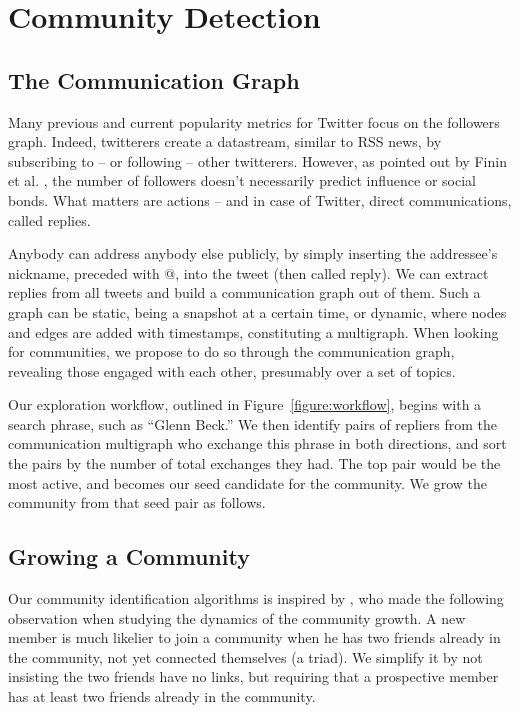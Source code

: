 \section{Community Detection}

\subsection{The Communication Graph}

Many previous and current popularity metrics for Twitter focus on the followers graph.  Indeed, twitterers create a datastream, similar to RSS news, by subscribing to -- or following -- other twitterers.  However, as pointed out by Finin et al. \cite{DBLP:conf/kdd/JavaSFT07}, the number of followers doesn’t necessarily predict influence or social bonds.  What matters are actions -- and in case of Twitter, direct communications, called replies.

Anybody can address anybody else publicly, by simply inserting the addressee’s nickname, preceded with @, into the tweet (then called reply).  We can extract replies from all tweets and build a communication graph out of them.  Such a graph can be static, being a snapshot at a certain time, or dynamic, where nodes and edges are added with timestamps, constituting a multigraph.  When looking for communities, we propose to do so through the communication graph, revealing those engaged with each other, presumably over a set of topics.

Our exploration workflow, outlined in Figure~\ref{figure:workflow}, begins with a search phrase, such as ``Glenn Beck.''  We then identify pairs of repliers from the communication multigraph who exchange this phrase in both directions, and sort the pairs by the number of total exchanges they had.  The top pair would be the most active, and becomes our seed candidate for the community.  We grow the community from that seed pair as follows.

\subsection{Growing a Community}

Our community identification algorithms is inspired by \cite{DBLP:conf/kdd/BackstromHKL06}, who made the following observation when studying the dynamics of the community growth.  A new member is much likelier to join a community when he has two friends already in the community, not yet connected themselves (a triad).  We simplify it by not insisting the two friends have no links, but requiring that a prospective member has at least two friends already in the community.

